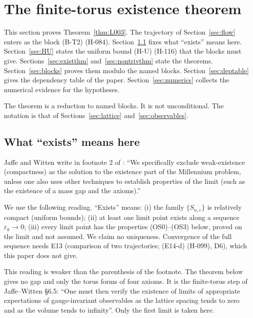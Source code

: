 \ifdefined\hypothesis\else\theoremstyle{definition}\newtheorem{hypothesis}[theorem]{Hypothesis}\fi
\ifdefined\openproblem\else\theoremstyle{definition}\newtheorem{openproblem}[theorem]{Open Problem}\fi
\theoremstyle{plain}

\section{The finite-torus existence theorem}\label{sec:torus}

This section proves Theorem~\ref{thm:L003}. The trajectory of Section~\ref{sec:flow} enters as the block (B-T2) (H-084). Section~\ref{sec:exists} fixes what ``exists'' means here. Section~\ref{sec:HU} states the uniform bound (H-U) (H-116) that the blocks must give. Sections~\ref{sec:existthm} and~\ref{sec:nontrivthm} state the theorems. Section~\ref{sec:blocks} proves them modulo the named blocks. Section~\ref{sec:deptable} gives the dependency table of the paper. Section~\ref{sec:numerics} collects the numerical evidence for the hypotheses.

The theorem is a reduction to named blocks. It is not unconditional. The notation is that of Sections~\ref{sec:lattice} and~\ref{sec:observables}.

\subsection{What ``exists'' means here}\label{sec:exists}
Jaffe and Witten write in footnote 2 of \cite{jaffewitten}: ``We specifically exclude weak-existence (compactness) as the solution to the existence part of the Millennium problem, unless one also uses other techniques to establish properties of the limit (such as the existence of a mass gap and the axioms).''

We use the following reading. ``Exists'' means: (i) the family $\{S_{n,\varepsilon}\}$ is relatively compact (uniform bounds); (ii) at least one limit point exists along a sequence $\varepsilon_k\to0$; (iii) every limit point has the properties (OS0)--(OS3) below, proved on the limit and not assumed. We claim no uniqueness. Convergence of the full sequence needs E13 (comparison of two trajectories; (E14-d) (H-099), D6), which this paper does not give.

This reading is weaker than the parenthesis of the footnote. The theorem below gives no gap and only the torus forms of four axioms. It is the finite-torus step of Jaffe--Witten \S6.5: ``One must then verify the existence of limits of appropriate expectations of gauge-invariant observables as the lattice spacing tends to zero and as the volume tends to infinity''. Only the first limit is taken here.

